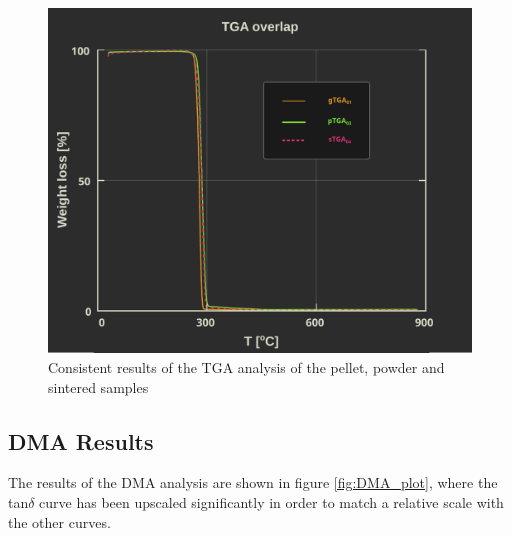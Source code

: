 \documentclass{article}
\begin{document}
                \begin{figure}[h!]
                    \centering
                    \includegraphics[width=\textwidth]{Pictures/Thermal_analysis_plots/TGA_catalogued/Fixed/TGA_overlapped.pdf}
                    \caption{Consistent results of the TGA analysis of the pellet, powder and sintered samples}
                    \label{fig:TGA_overlapped}
                \end{figure}

        \clearpage

        \subsection{DMA Results\label{DMA_Results}}

        The results of the DMA analysis are shown in figure \ref{fig:DMA_plot}, where the tan$\delta$ curve has been upscaled significantly 
        in order to match a relative scale with the other curves. \\ 
\end{document}
